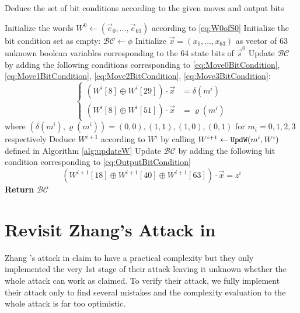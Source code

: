 \begin{algorithm}[htbp]
	\caption{Deduce the set of bit conditions according to the given moves and output bits} \label{alg:getBC}
	\begin{algorithmic}[1]
\State Initialize the words $W^0\leftarrow (\vec e_0,\ldots, \vec e_{63})$ according to \eqref{eq:W0ofS0}
\State Initialize the bit condition set as empty: $\mathcal{BC}\leftarrow \phi$
\State Initialize $\vec{x}=(x_0,\ldots, x_{63})$ as vector of 63 unknown boolean variables corresponding to the 64 state bits of $\vec s^0$
\State Update $\mathcal{BC}$ by adding the following conditions corresponding to \eqref{eq:Move0BitCondition}, \eqref{eq:Move1BitCondition}, \eqref{eq:Move2BitCondition}, \eqref{eq:Move3BitCondition}:
\[
\left\{
\begin{aligned}
(W^i[8]\oplus W^i[29])\cdot \vec x&=\delta(m^i)\\
(W^i[8]\oplus W^i[51])\cdot \vec x&=\varrho(m^i)
\end{aligned}
\right.
\]
where $(\delta(m^i), \varrho(m^i))=(0,0),(1,1),(1,0),(0,1)$ for $m_i=0,1,2,3$ respectively
\EndIf
\State Deduce $W^{i+1}$ according to $W^{i}$ by calling $W^{i+1}\leftarrow {\tt UpdW}(m^i,W^i)$ defined in Algorithm \ref{alg:updateW}
\State Update $\mathcal{BC}$ by adding the following bit condition corresponding to \eqref{eq:OutputBitCondition}
\[
(W^{i+1}[18]\oplus W^{i+1}[40]\oplus W^{i+1}[63])\cdot \vec x =z^i
\]
\EndFor
\State \textbf{Return} $\mathcal{BC}$
		\EndProcedure
	\end{algorithmic}
\end{algorithm}


\section{Revisit Zhang's Attack in \cite{AC:Zhang19}}
Zhang \etal's attack in \cite{AC:Zhang19} claim to have a practical complexity but they only implemented the very 1st stage of their attack leaving it unknown whether the whole attack can work as claimed.
To verify their attack, we fully implement their attack only to find several mistakes and the complexity evaluation to the whole attack is far too optimistic.
